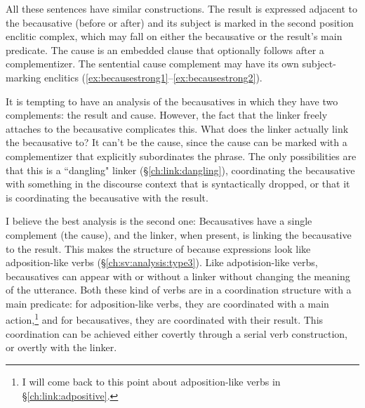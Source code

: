 All these sentences have similar constructions. The result is expressed adjacent to the becausative (before or after) and its subject is marked in the second position enclitic complex, which may fall on either the becausative or the result's main predicate. The cause is an embedded clause that optionally follows after a complementizer. The sentential cause complement may have its own subject-marking enclitics (\ref{ex:becausestrong1}--\ref{ex:becausestrong2}).

It is tempting to have an analysis of the becausatives in which they have two complements: the result and cause. However, the fact that the linker freely attaches to the becausative complicates this. What does the linker actually link the becausative to? It can't be the cause, since the cause can be marked with a complementizer that explicitly subordinates the phrase. The only possibilities are that this is a ``dangling" linker (\S\ref{ch:link:dangling}), coordinating the becausative with something in the discourse context that is syntactically dropped, or that it is coordinating the becausative with the result.

I believe the best analysis is the second one: Becausatives have a single complement (the cause), and the linker, when present, is linking the becausative to the result. This makes the structure of because expressions look like adposition-like verbs (\S\ref{ch:sv:analysis:type3}). Like adpotision-like verbs, becausatives can appear with or without a linker without changing the meaning of the utterance. Both these kind of verbs are in a coordination structure with a main predicate: for adposition-like verbs, they are coordinated with a main action,\footnote{I will come back to this point about adposition-like verbs in \S\ref{ch:link:adpositive}.} and for becausatives, they are coordinated with their result. This coordination can be achieved either covertly through a serial verb construction, or overtly with the linker.


